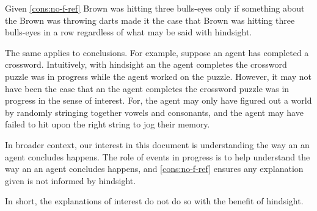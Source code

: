 \begin{note}
  Given \autoref{cons:no-f-ref} Brown was hitting three bulls-eyes only if something about the  Brown was throwing darts made it the case that Brown was hitting three bulls-eyes in a row regardless of what may be said with hindsight.

  The same applies to conclusions.
  For example, suppose an agent has completed a crossword.
  Intuitively, with hindsight an  the agent completes the crossword puzzle was in progress while the agent worked on the puzzle.
  However, it may not have been the case that an  the agent completes the crossword puzzle was in progress in the sense of interest.
  For, the agent may only have figured out a world by randomly stringing together vowels and consonants, and the agent may have failed to hit upon the right string to jog their memory.
\end{note}


\begin{note}
  In broader context, our interest in this document is understanding the way an  an agent concludes happens.
  The role of events in progress is to help understand the way an  an agent concludes happens, and \autoref{cons:no-f-ref} ensures any explanation given is not informed by hindsight.

  In short, the explanations of interest do not do so with the benefit of hindsight.
\end{note}






